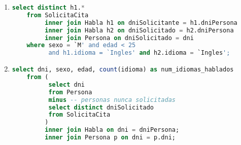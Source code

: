 \begin{enumerate}
	\item 
	\begin{lstlisting}[language=sql]
	select distinct h1.*
	from SolicitaCita
		 inner join Habla h1 on dniSolicitante = h1.dniPersona
		 inner join Habla h2 on dniSolicitado = h2.dniPersona
		 inner join Persona on dniSolicitado = dni
	where sexo = `M' and edad < 25 
		  and h1.idioma = `Ingles' and h2.idioma = `Ingles';\end{lstlisting}
	
	\item
	\begin{lstlisting}[language=sql]
	select dni, sexo, edad, count(idioma) as num_idiomas_hablados
	from ( 
		  select dni
		  from Persona
		  minus -- personas nunca solicitadas
		  select distinct dniSolicitado
		  from SolicitaCita
		 )
		 inner join Habla on dni = dniPersona;
		 inner join Persona p on dni = p.dni;\end{lstlisting}
\end{enumerate}